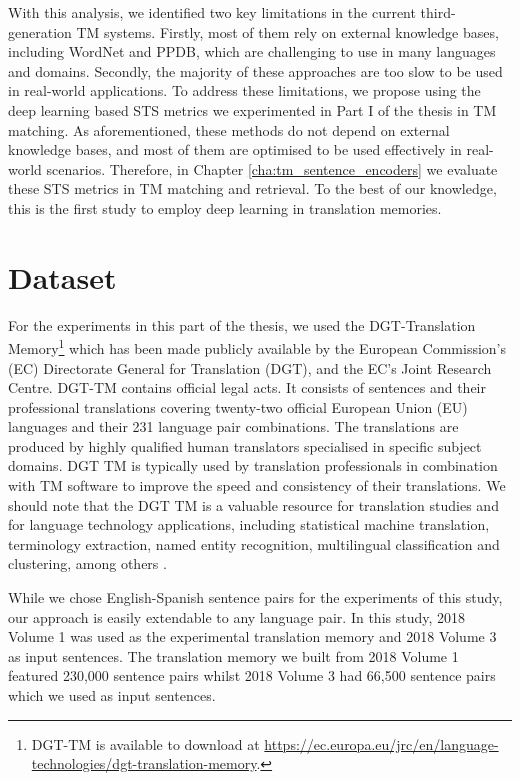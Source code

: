 With this analysis, we identified two key limitations in the current third-generation TM systems. Firstly, most of them rely on external knowledge bases, including WordNet and PPDB, which are challenging to use in many languages and domains. Secondly, the majority of these approaches are too slow to be used in real-world applications. To address these limitations, we propose using the deep learning based STS metrics we experimented in Part I of the thesis in TM matching. As aforementioned, these methods do not depend on external knowledge bases, and most of them are optimised to be used effectively in real-world scenarios. Therefore, in Chapter \ref{cha:tm_sentence_encoders} we evaluate these STS metrics in TM matching and retrieval. To the best of our knowledge, this is the first study to employ deep learning in translation memories. 




\section{Dataset}
\label{sec:tm_data}
For the experiments in this part of the thesis, we used the DGT-Translation Memory\footnote{DGT-TM is available to download at \url{https://ec.europa.eu/jrc/en/language-technologies/dgt-translation-memory}.} which has been made publicly available by the European Commission’s (EC) Directorate General for Translation (DGT), and the EC’s Joint Research Centre. DGT-TM contains official legal acts. It consists of sentences and their professional translations covering twenty-two official European Union (EU) languages and their 231 language pair combinations. The translations are produced by highly qualified human translators specialised in specific subject domains. DGT TM is typically used by translation professionals in combination with TM software to improve the speed and consistency of their translations. We should note that the DGT TM is a valuable resource for translation studies and for language technology applications, including statistical machine translation, terminology extraction, named entity recognition, multilingual classification and clustering, among others \autocite{aker-etal-2013-extracting, besacier-schwartz-2015-automated}. 

While we chose English-Spanish sentence pairs for the experiments of this study, our approach is easily extendable to any language pair. In this study, 2018 Volume 1 was used as the experimental translation memory and 2018 Volume 3 as input sentences. The translation memory we built from 2018 Volume 1 featured 230,000 sentence pairs whilst 2018 Volume 3 had 66,500 sentence pairs which we used as input sentences. 

